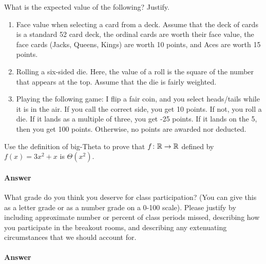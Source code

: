 \documentclass{article}
\begin{document}
What is the expected value of the following? Justify.

\begin{enumerate}
    \item Face value when selecting a card from a deck.  Assume that the deck of
        cards is a standard 52 card deck, the ordinal cards are worth their face
        value, the face cards (Jacks, Queens, Kings) are
        worth 10 points, and Aces are worth 15 points.
    \item Rolling a six-sided die.  Here, the value of a roll is the square of
        the number that appears at the top.  Assume that the die is fairly
        weighted.
    \item Playing the following game: I flip a fair coin, and you select
        heads/tails while it is in the air.  If you call the correct side,
        you get 10 points.  If not, you roll a die.  If it lands as a
        multiple of three, you get -25 points.
        If it lands on the 5, then you get 100 points.  Otherwise, no points are
        awarded nor deducted.
\end{enumerate}

\collab{\todo{}} 

Use the definition of big-Theta to prove that $f \colon {\mathbb R} \to {\mathbb R}$ defined by
$f(x) = 3x^2+x$ is $\Theta(x^2)$.

\paragraph{Answer}



\collab{\todo{}} 

What grade do you think you deserve for class participation? (You can give this
as a letter grade or as a number grade on a 0-100 scale). Please justify by
including approximate number or percent of class periods missed, describing how
you participate in the breakout rooms, and describing any extenuating
circumstances that we should account for.

\paragraph{Answer}
\end{document}
